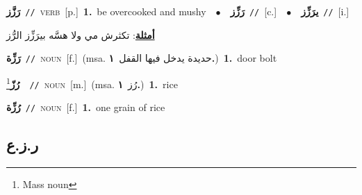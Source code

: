 \documentclass[10pt,a4paper,twoside]{article} %
\begin{document}
\begin{multicols}{2}
{\setlength\topsep{0pt}\textbf{\foreignlanguage{arabic}{رَزَّز}}\ {\color{gray}\texttt{//}\color{black}}\ \textsc{verb}\ [p.]\ \textbf{1.}~be overcooked and mushy\ \ $\bullet$\ \ \setlength\topsep{0pt}\textbf{\foreignlanguage{arabic}{رَزِّز}}\ {\color{gray}\texttt{//}\color{black}}\ [c.]\ \ $\bullet$\ \ \setlength\topsep{0pt}\textbf{\foreignlanguage{arabic}{يرَزِّز}}\ {\color{gray}\texttt{//}\color{black}}\ [i.]\  \begin{flushright}\color{gray}\foreignlanguage{arabic}{\textbf{\underline{\foreignlanguage{arabic}{أمثلة}}}: تكثرش مي ولا هسَّه بيرَزِّز الرُّز}\end{flushright}\color{black}} \vspace{2mm}

{\setlength\topsep{0pt}\textbf{\foreignlanguage{arabic}{رَزِّة}}\ {\color{gray}\texttt{//}\color{black}}\ \textsc{noun}\ [f.]\ \color{gray}(msa. \foreignlanguage{arabic}{حديدة يدخل فيها القفل}~\foreignlanguage{arabic}{\textbf{١.}})\color{black}\ \textbf{1.}~door bolt\ } \vspace{2mm}

{\setlength\topsep{0pt}\textbf{\foreignlanguage{arabic}{رُزّ}}\footnote{Mass noun}\ \ {\color{gray}\texttt{//}\color{black}}\ \textsc{noun}\ [m.]\ \color{gray}(msa. \foreignlanguage{arabic}{رُز}~\foreignlanguage{arabic}{\textbf{١.}})\color{black}\ \textbf{1.}~rice\ } \vspace{2mm}

{\setlength\topsep{0pt}\textbf{\foreignlanguage{arabic}{رُزِّة}}\ {\color{gray}\texttt{//}\color{black}}\ \textsc{noun}\ [f.]\ \textbf{1.}~one grain of rice\ } \vspace{2mm}

\vspace{-3mm}
\subsection*{\color{blue}\foreignlanguage{arabic}{ر.ز.ع}\color{blue}{}} 


\end{multicols}
\end{document}
